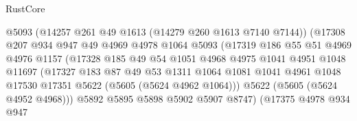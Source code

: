 \begin{lexlean}{RustCore}
\begin{coremodule}
                                  @5093
                                  (@14257 @261 @49 @1613 (@14279 @260 @1613 @7140 @7144))
                                  (@17308
                                    @207
                                    @934
                                    @947
                                    @49
                                    @4969
                                    @4978
                                    @1064
                                    @5093
                                    (@17319
                                      @186
                                      @55
                                      @51
                                      @4969
                                      @4976
                                      @1157
                                      (@17328
                                        @185
                                        @49
                                        @54
                                        @1051
                                        @4968
                                        @4975
                                        @1041
                                        @4951
                                        @1048
                                        @11697
                                        (@17327
                                          @183
                                          @87
                                          @49
                                          @53
                                          @1311
                                          @1064
                                          @1081
                                          @1041
                                          @4961
                                          @1048
                                          @17530
                                          @17351
                                          @5622
                                          (@5605 (@5624 @4962 @1064)))
                                        @5622
                                        (@5605 (@5624 @4952 @4968)))
                                      @5892
                                      @5895
                                      @5898
                                      @5902
                                      @5907
                                      @8747)
                                    (@17375
                                      @4978
                                      @934
                                      @947

\end{coremodule}
\end{lexlean}
